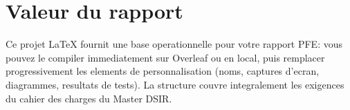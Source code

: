 \section{Valeur du rapport}

Ce projet LaTeX fournit une base operationnelle pour votre rapport PFE: vous pouvez le compiler immediatement sur Overleaf ou en local, puis remplacer progressivement les elements de personnalisation (noms, captures d'ecran, diagrammes, resultats de tests). La structure couvre integralement les exigences du cahier des charges du Master DSIR.
